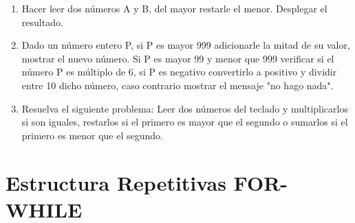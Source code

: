 \documentclass{scrartcl}
\begin{document}
\begin{enumerate}
		\item Hacer leer dos números A y B, del mayor restarle el menor. Desplegar el resultado.
		
		\item Dado un número entero P, si P es mayor 999 adicionarle la mitad de su valor, mostrar el nuevo número. Si P es mayor 99 y menor que 999 verificar si el número P es múltiplo de 6, si P es negativo convertirlo a positivo y dividir entre 10 dicho número, caso contrario mostrar el mensaje "no hago nada".
		
		\item Resuelva el siguiente problema: Leer dos números del teclado y multiplicarlos si son iguales, restarlos si el primero es mayor que el segundo o sumarlos si el primero es menor que el segundo.
	\end{enumerate}

\section{Estructura Repetitivas FOR-WHILE}
	
\end{document}
